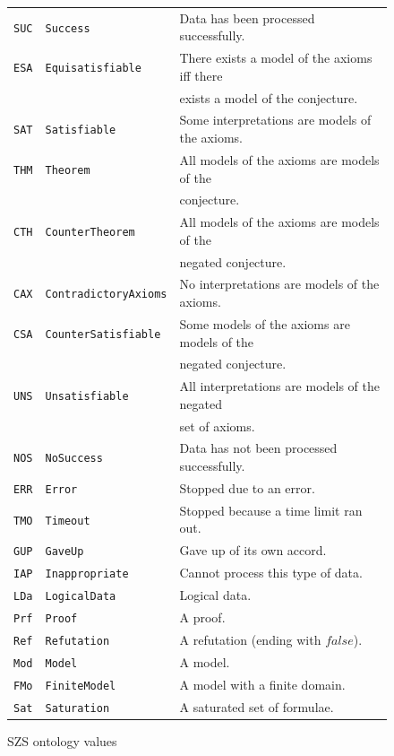 \documentclass[runningheads]{llncs}
\begin{document}
\begin{figure}[htb]
\centering
\begin{tabular}{lll}
\hline
{\tt SUC} & {\tt Success}             & 
Data has been processed successfully. \\
{\tt ESA} & {\tt Equisatisfiable}     & 
There exists a model of the axioms iff there \\
          &                           & exists a model of the conjecture.\\
{\tt SAT} & {\tt Satisfiable}         & 
Some interpretations are models of the axioms.\\
{\tt THM} & {\tt Theorem}             & 
All models of the axioms are models of the \\
          &                           & conjecture.\\
{\tt CTH} & {\tt CounterTheorem}      & 
All models of the axioms are models of the \\
          &                           & negated conjecture.\\
{\tt CAX} & {\tt ContradictoryAxioms} & 
No interpretations are models of the axioms.\\
{\tt CSA} & {\tt CounterSatisfiable}  & 
Some models of the axioms are models of the \\
          &                           & negated conjecture.\\
{\tt UNS} & {\tt Unsatisfiable}       & 
All interpretations are models of the negated \\
          &                           & set of axioms.\\
\hline
{\tt NOS} & {\tt NoSuccess}           & 
Data has not been processed successfully. \\
{\tt ERR} & {\tt Error}               & 
Stopped due to an error. \\
{\tt TMO} & {\tt Timeout}             & 
Stopped because a time limit ran out. \\
{\tt GUP} & {\tt GaveUp}              & 
Gave up of its own accord. \\
{\tt IAP} & {\tt Inappropriate}       & 
Cannot process this type of data. \\
\hline
{\tt LDa} & {\tt LogicalData}         & 
Logical data. \\
{\tt Prf} & {\tt Proof}               & 
A proof. \\
{\tt Ref} & {\tt Refutation}          & 
A refutation (ending with $false$). \\
{\tt Mod} & {\tt Model}               & 
A model. \\
{\tt FMo} & {\tt FiniteModel}         & 
A model with a finite domain. \\
{\tt Sat} & {\tt Saturation}          & 
A saturated set of formulae. \\
\hline
\end{tabular}
\caption{SZS ontology values}
\label{SZSTable}
\end{figure} 
\end{document}
